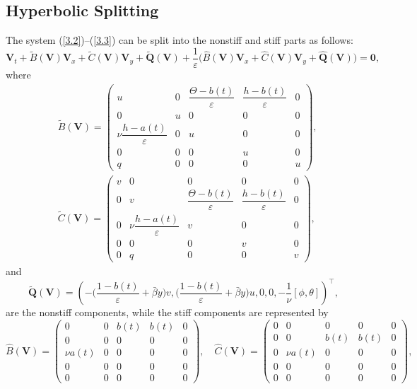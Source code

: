 \documentclass[a4paper,11pt,twoside]{article}
\numberwithin{equation}{section}
\numberwithin{figure}{section}
\numberwithin{table}{section}
\newcommand{\eps}{\varepsilon}
\newcommand{\bV}{\bm{V}}
\newcommand{\bQ}{\bm{Q}}
\newcommand\eref[1]{(\ref{#1})}
\begin{document}
\subsection{Hyperbolic Splitting}\label{sec31}
The system \eref{3.2}--\eref{3.3} can be split into the nonstiff and stiff parts as follows:
\begin{equation}
\bV_t+\widetilde{B}(\bV)\bV_x+\widetilde{C}(\bV)\bV_y+\widetilde{\bQ}(\bV)+\frac{1}{\eps}\Big(\widehat{B}(\bV)\bV_x
+\widehat{C}(\bV)\bV_y+\widehat{\bQ}(\bV)\Big)=\bm0,
\label{3.4}
\end{equation}
where 
\begin{equation}
\begin{aligned}
&\widetilde{B}(\bV)=\begin{pmatrix}
u&0&\dfrac{\Theta-b(t)}{\eps}&\dfrac{h-b(t)}{\eps}&0\\0&u&0&0&0\\\nu\dfrac{h-a(t)}{\eps}&0&u&0&0\\0&0&0&u&0\\q&0&0&0&u
\end{pmatrix},\\[1ex]
&\widetilde{C}(\bV)=\begin{pmatrix}
v&0&0&0&0\\0&v&\dfrac{\Theta-b(t)}{\eps}&\dfrac{h-b(t)}{\eps}&0\\0&\nu\dfrac{h-a(t)}{\eps}&v&0&0\\0&0&0&v&0\\0&q&0&0&v
\end{pmatrix},
\end{aligned}
\label{3.5}
\end{equation}
and
\begin{equation}
\widetilde{\bQ}(\bV)=
\left(-\Big(\frac{1-b(t)}{\eps}+\bar{\beta}y\Big)v,\Big(\frac{1-b(t)}{\eps}+\bar{\beta}y\Big)u,0,0,-\frac{1}{\nu}[\phi,\theta]\right)^\top,
\label{3.6}
\end{equation}
are the nonstiff components, while the stiff components are represented by
\begin{equation}
\widehat{B}(\bV)=\begin{pmatrix}
0&0&b(t)&b(t)&0\\0&0&0&0&0\\\nu a(t)&0&0&0&0\\0&0&0&0&0\\0&0&0&0&0
\end{pmatrix},\quad
\widehat{C}(\bV)=\begin{pmatrix}
0&0&0&0&0\\0&0&b(t)&b(t)&0\\0&\nu a(t)&0&0&0\\0&0&0&0&0\\0&0&0&0&0
\end{pmatrix},
\label{3.7}
\end{equation}
\end{document}
